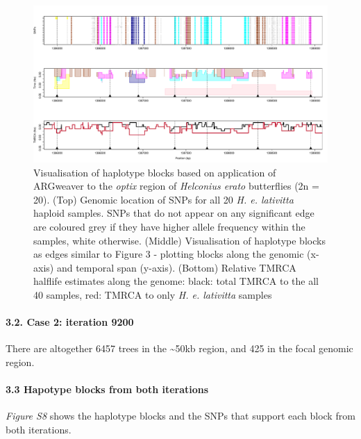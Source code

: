 \documentclass[
]{article}
\begin{document}
\begin{figure}

{\centering \includegraphics{figS8} 

}

\caption{ \footnotesize Visualisation of haplotype blocks based on application of ARGweaver to the \textit{optix} region of \textit{Helconius erato} butterflies (2n = 20). (Top) Genomic location of SNPs for all 20 \textit{H. e. lativitta} haploid samples. SNPs that do not appear on any significant edge are coloured grey if they have higher allele frequency within the samples, white otherwise.  (Middle) Visualisation of haplotype blocks as edges similar to Figure 3 - plotting blocks along the genomic (x-axis) and temporal span (y-axis). (Bottom) Relative TMRCA halflife estimates along the genome: black: total TMRCA to the all 40 samples, red: TMRCA to only \textit{H. e. lativitta} samples }\label{fig:fig S8 - imp hap blocks iter 8250}
\end{figure}

\hypertarget{case-2-iteration-9200}{%
\paragraph{\texorpdfstring{3.2. Case 2: iteration 9200\\
}{3.2. Case 2: iteration 9200 }}\label{case-2-iteration-9200}}

\hfill\break
There are altogether 6457 trees in the \textasciitilde50kb region, and
425 in the focal genomic region.

\hypertarget{hapotype-blocks-from-both-iterations}{%
\paragraph{\texorpdfstring{3.3 Hapotype blocks from both iterations\\
}{3.3 Hapotype blocks from both iterations }}\label{hapotype-blocks-from-both-iterations}}
\emph{Figure S8} shows the haplotype blocks and the SNPs that support
each block from both iterations.
\end{document}
